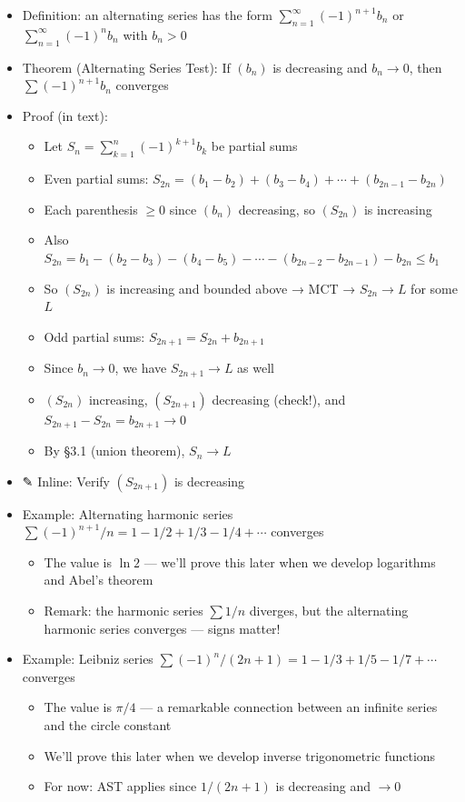 \documentclass[
  10pt,
  letterpaper,
]{scrbook}
\providecommand{\tightlist}{%
  \setlength{\itemsep}{0pt}\setlength{\parskip}{0pt}}
\begin{document}
\begin{itemize}
\tightlist
\item
  Definition: an alternating series has the form
  \(\sum_{n=1}^{\infty} (-1)^{n+1} b_n\) or
  \(\sum_{n=1}^{\infty} (-1)^n b_n\) with \(b_n > 0\)
\item
  Theorem (Alternating Series Test): If \((b_n)\) is decreasing and
  \(b_n \to 0\), then \(\sum (-1)^{n+1} b_n\) converges
\item
  Proof (in text):

  \begin{itemize}
  \tightlist
  \item
    Let \(S_n = \sum_{k=1}^{n} (-1)^{k+1} b_k\) be partial sums
  \item
    Even partial sums:
    \(S_{2n} = (b_1 - b_2) + (b_3 - b_4) + \cdots + (b_{2n-1} - b_{2n})\)
  \item
    Each parenthesis \(\geq 0\) since \((b_n)\) decreasing, so
    \((S_{2n})\) is increasing
  \item
    Also
    \(S_{2n} = b_1 - (b_2 - b_3) - (b_4 - b_5) - \cdots - (b_{2n-2} - b_{2n-1}) - b_{2n} \leq b_1\)
  \item
    So \((S_{2n})\) is increasing and bounded above → MCT →
    \(S_{2n} \to L\) for some \(L\)
  \item
    Odd partial sums: \(S_{2n+1} = S_{2n} + b_{2n+1}\)
  \item
    Since \(b_n \to 0\), we have \(S_{2n+1} \to L\) as well
  \item
    \((S_{2n})\) increasing, \((S_{2n+1})\) decreasing (check!), and
    \(S_{2n+1} - S_{2n} = b_{2n+1} \to 0\)
  \item
    By §3.1 (union theorem), \(S_n \to L\)
  \end{itemize}
\item
  ✎ Inline: Verify \((S_{2n+1})\) is decreasing
\item
  Example: Alternating harmonic series
  \(\sum (-1)^{n+1}/n = 1 - 1/2 + 1/3 - 1/4 + \cdots\) converges

  \begin{itemize}
  \tightlist
  \item
    The value is \(\ln 2\) --- we'll prove this later when we develop
    logarithms and Abel's theorem
  \item
    Remark: the harmonic series \(\sum 1/n\) diverges, but the
    alternating harmonic series converges --- signs matter!
  \end{itemize}
\item
  Example: Leibniz series
  \(\sum (-1)^{n}/(2n+1) = 1 - 1/3 + 1/5 - 1/7 + \cdots\) converges

  \begin{itemize}
  \tightlist
  \item
    The value is \(\pi/4\) --- a remarkable connection between an
    infinite series and the circle constant
  \item
    We'll prove this later when we develop inverse trigonometric
    functions
  \item
    For now: AST applies since \(1/(2n+1)\) is decreasing and \(\to 0\)
  \end{itemize}
\end{itemize}
\end{document}
